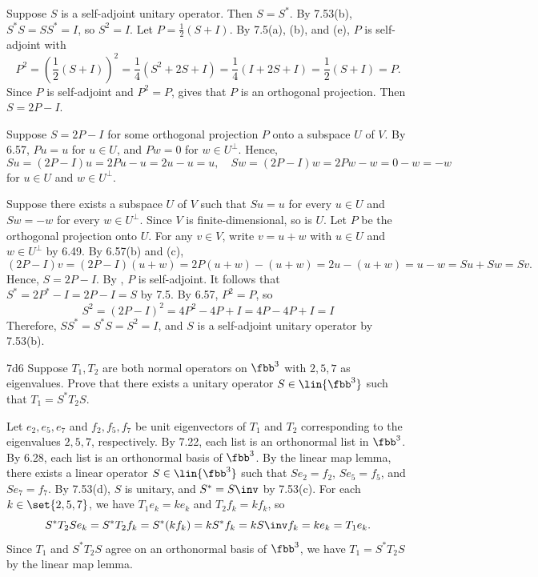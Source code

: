 \begin{sol}
    \leavevmode

    \noindent{}
    Suppose $S$ is a self-adjoint unitary operator.
    Then $S = S^\ast$.
    By 7.53(b), $S^\ast S = SS^\ast = I$, so $S^2 = I$.
    Let $P = \frac{1}{2}(S + I)$.
    By 7.5(a), (b), and (e), $P$ is self-adjoint with
    \[
        P^2 = \left(\frac{1}{2}(S + I)\right)^2 = \frac{1}{4}(S^2 + 2S + I) = \frac{1}{4}(I + 2S + I) = \frac{1}{2}(S + I) = P.
    \]
    Since $P$ is self-adjoint and $P^2 = P$,  gives that $P$ is an orthogonal projection.
    Then $S = 2P - I$.

    \noindent{}
    Suppose $S = 2P - I$ for some orthogonal projection $P$ onto a subspace $U$ of $V$.
    By 6.57, $P u = u$ for $u \in U$, and $P w = 0$ for $w \in U^\perp$.
    Hence,
    \[
        S u = (2P - I) u = 2P u - u = 2u - u = u, \quad S w = (2P - I) w = 2P w - w = 0 - w = -w
    \]
    for $u \in U$ and $w \in U^\perp$.

    \noindent{}
    Suppose there exists a subspace $U$ of $V$ such that $Su = u$ for every $u \in U$ and $Sw = -w$ for every $w \in U^\perp$.
    Since $V$ is finite-dimensional, so is $U$.
    Let $P$ be the orthogonal projection onto $U$.
    For any $v \in V$, write $v = u + w$ with $u \in U$ and $w \in U^\perp$ by 6.49.
    By 6.57(b) and (c),
    \[
        (2P - I) v = (2P - I)(u + w) = 2P(u + w) - (u + w) = 2u - (u + w) = u - w = Su + Sw = Sv.
    \]
    Hence, $S = 2P - I$.
    By , $P$ is self-adjoint.
    It follows that $S^\ast = 2P^\ast - I = 2P - I = S$ by 7.5.
    By 6.57, $P^2 = P$, so
    \[
        S^2 = (2P - I)^2 = 4P^2 - 4P + I = 4P - 4P + I = I
    \]
    Therefore, $SS^\ast = S^\ast S = S^2 = I$, and $S$ is a self-adjoint unitary operator by 7.53(b).
\end{sol}

\begin{exercise}{7d6}
    Suppose $T_1, T_2$ are both normal operators on $\fbb^3$ with $2, 5, 7$ as eigenvalues.
    Prove that there exists a unitary operator $S \in \lin{\fbb^3}$ such that $T_1 = S^\ast T_2 S$.
\end{exercise}

\begin{sol}
    Let $e_2, e_5, e_7$ and $f_2, f_5, f_7$ be unit eigenvectors of $T_1$ and $T_2$ corresponding to the eigenvalues $2, 5, 7$, respectively.
    By 7.22, each list is an orthonormal list in $\fbb^3$.
    By 6.28, each list is an orthonormal basis of $\fbb^3$.
    By the linear map lemma, there exists a linear operator $S \in \lin{\fbb^3}$ such that $S e_2 = f_2$, $S e_5 = f_5$, and $S e_7 = f_7$.
    By 7.53(d), $S$ is unitary, and $S^\ast = S\inv$ by 7.53(c).
    For each $k \in \set{2, 5, 7}$, we have $T_1 e_k = k e_k$ and $T_2 f_k = k f_k$, so
    \[
        S^\ast T_2 S e_k = S^\ast T_2 f_k = S^\ast (k f_k) = k S^\ast f_k = k S\inv f_k = k e_k = T_1 e_k.
    \]
    Since $T_1$ and $S^\ast T_2 S$ agree on an orthonormal basis of $\fbb^3$, we have $T_1 = S^\ast T_2 S$ by the linear map lemma.
\end{sol}

